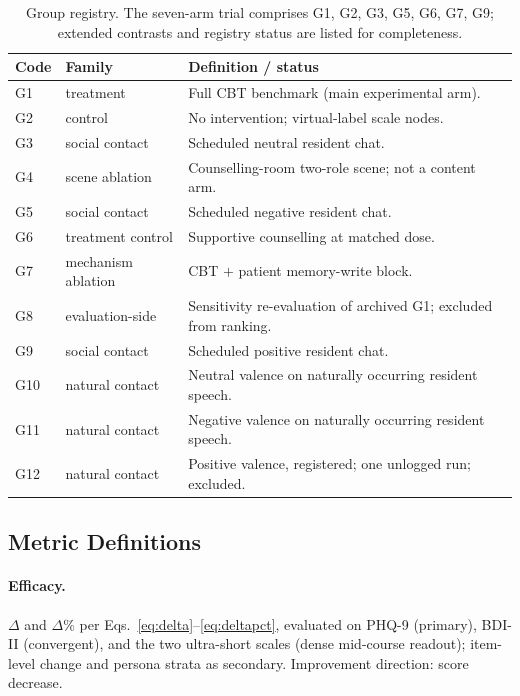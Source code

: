 \documentclass[10pt]{article}
\begin{document}
\begin{table}[h]
\centering
\caption{Group registry. The seven-arm trial comprises G1, G2, G3, G5, G6, G7, G9; extended contrasts and registry status are listed for completeness.}
\label{tab:registry}
\small
\begin{tabular}{@{}llp{8.6cm}@{}}
\toprule
Code & Family & Definition / status \\
\midrule
G1 & treatment & Full CBT benchmark (main experimental arm). \\
G2 & control & No intervention; virtual-label scale nodes. \\
G3 & social contact & Scheduled neutral resident chat. \\
G4 & scene ablation & Counselling-room two-role scene; not a content arm. \\
G5 & social contact & Scheduled negative resident chat. \\
G6 & treatment control & Supportive counselling at matched dose. \\
G7 & mechanism ablation & CBT $+$ patient memory-write block. \\
G8 & evaluation-side & Sensitivity re-evaluation of archived G1; excluded from ranking. \\
G9 & social contact & Scheduled positive resident chat. \\
G10 & natural contact & Neutral valence on naturally occurring resident speech. \\
G11 & natural contact & Negative valence on naturally occurring resident speech. \\
G12 & natural contact & Positive valence, registered; one unlogged run; excluded. \\
\bottomrule
\end{tabular}
\end{table}

\subsection{Metric Definitions}

\paragraph{Efficacy.}
$\Delta$ and $\Delta\%$ per Eqs.~\ref{eq:delta}--\ref{eq:deltapct}, evaluated on PHQ-9 (primary), BDI-II (convergent), and the two ultra-short scales (dense mid-course readout); item-level change and persona strata as secondary.
Improvement direction: score decrease.
\end{document}
